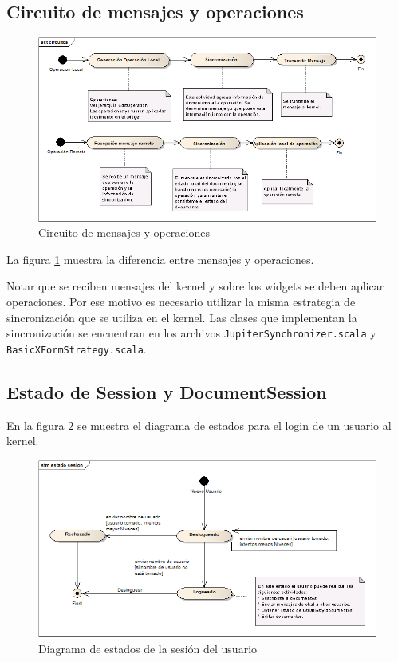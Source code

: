 \documentclass[12pt,a4paper]{article}
\begin{document}
\subsection{Circuito de mensajes y operaciones}

	\begin{figure}[!ht]
		\begin{center}
			\includegraphics[width=14cm]{circuitos-mensajes.png}
			\caption{\label{circuitos-mensajes} Circuito de mensajes y operaciones }
		\end{center}
	\end{figure}


La figura \ref{circuitos-mensajes} muestra la diferencia entre mensajes y operaciones.

Notar que se reciben mensajes del kernel y sobre los widgets se deben aplicar operaciones. Por ese motivo es necesario 
utilizar la misma estrategia de sincronización que se utiliza en el kernel. Las clases que implementan la sincronización se 
encuentran en los archivos 
\texttt{JupiterSynchronizer.scala}
y \texttt{BasicXFormStrategy.scala}.

\subsection{Estado de Session y DocumentSession}

En la figura \ref{estado-sesion} se muestra el diagrama de estados para el login de un usuario al kernel.

	\begin{figure}[!ht]
		\begin{center}
			\includegraphics[width=14cm]{estado-sesion.png}
			\caption{\label{estado-sesion} Diagrama de estados de la sesión del usuario }
		\end{center}
	\end{figure}
\end{document}
